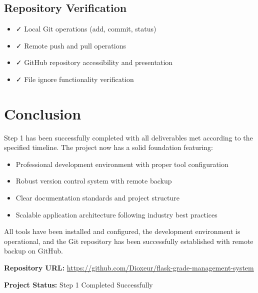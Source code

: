 \documentclass[12pt,a4paper]{article}
\begin{document}
\subsection{Repository Verification}
\begin{itemize}
    \item ✓ Local Git operations (add, commit, status)
    \item ✓ Remote push and pull operations
    \item ✓ GitHub repository accessibility and presentation
    \item ✓ File ignore functionality verification
\end{itemize}

\section{Conclusion}

Step 1 has been successfully completed with all deliverables met according to the specified timeline. The project now has a solid foundation featuring:

\begin{itemize}
    \item Professional development environment with proper tool configuration
    \item Robust version control system with remote backup
    \item Clear documentation standards and project structure
    \item Scalable application architecture following industry best practices
\end{itemize}

All tools have been installed and configured, the development environment is operational, and the Git repository has been successfully established with remote backup on GitHub.

\vspace{1cm}

\noindent\textbf{Repository URL:} \url{https://github.com/Dioxeur/flask-grade-management-system}

\noindent\textbf{Project Status:} Step 1 Completed Successfully
\end{document}
